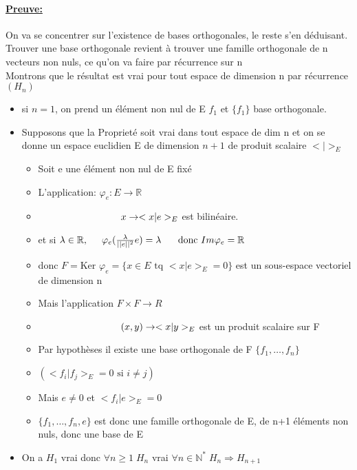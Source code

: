 \documentclass{article}
\newcommand\tab[1][1cm]{\hspace*{#1}}
\begin{document}
\paragraph{\underline{Preuve:}} On va se concentrer sur l'existence de bases orthogonales, le reste s'en déduisant. \\
Trouver une base orthogonale revient à trouver une famille orthogonale de n vecteurs non nuls, ce qu'on va faire par récurrence sur n \\
Montrons que le résultat est vrai pour tout espace de dimension n par récurrence $(H_n)$
\begin{itemize}
    \item si $n = 1$, on prend un élément non nul de E $f_1$ et $\{f_1\}$ base orthogonale.
    \item Supposons que la Proprieté soit vrai dans tout espace de dim n et on se donne un espace euclidien E de dimension $n + 1$ de produit scalaire $<|>_E$
    \begin{itemize}
        \item[] Soit e une élément non nul de E fixé
        \item[] L'application: $\varphi_e: E \rightarrow \mathbb{R}$
        \item[] $\tab[3cm] x \rightarrow <x|e>_E$ \tab[0.2cm] est bilinéaire.
        \item[] et si $\lambda \in \mathbb{R}, \tab[0.5cm] \varphi_e(\frac{\lambda}{||e||^2}e) = \lambda \tab[0.5cm] \mbox{ donc } Im \varphi_e = \mathbb{R}$
        \item[] donc $F = \mbox{Ker }\varphi_e = \{x \in E \mbox{ tq } <x | e>_E = 0\}$ est un sous-espace vectoriel de dimension n
        \item[] Mais l'application $F \times F \rightarrow R$
        \item[] $\tab[3cm] (x, y) \rightarrow <x|y>_E$ est un produit scalaire sur F
        \item[] Par hypothèses il existe une base orthogonale de F $\{f_1, \dots, f_n\}$
        \item[] $(<f_i|f_j>_E = 0 \mbox{ si } i \neq j)$
        \item[] Mais $e \neq 0$ et $<f_i | e>_E = 0$ 
        \item[] $\{f_1, \dots, f_n, e\}$ est donc une famille orthogonale de E, de n+1 éléments non nuls, donc une base de E 
    \end{itemize}
    \item On a $H_1$ vrai \tab donc $\forall n \geq 1 \; H_n$ vrai \tab $\forall n \in \mathbb{N}^* \; H_n \Rightarrow H_{n+1}$
\end{itemize}
\end{document}
